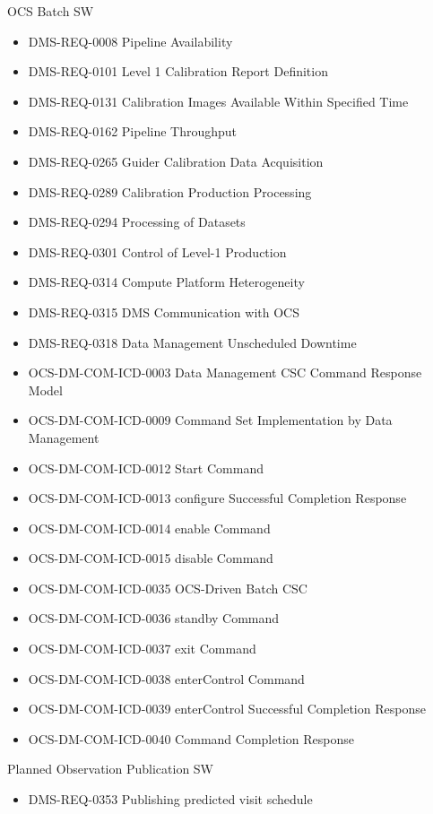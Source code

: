 OCS Batch SW \begin{itemize}
\item DMS-REQ-0008 Pipeline Availability
\item DMS-REQ-0101 Level 1 Calibration Report Definition
\item DMS-REQ-0131 Calibration Images Available Within Specified Time
\item DMS-REQ-0162 Pipeline Throughput
\item DMS-REQ-0265 Guider Calibration Data Acquisition
\item DMS-REQ-0289 Calibration Production Processing
\item DMS-REQ-0294 Processing of Datasets
\item DMS-REQ-0301 Control of Level-1 Production
\item DMS-REQ-0314 Compute Platform Heterogeneity
\item DMS-REQ-0315 DMS Communication with OCS
\item DMS-REQ-0318 Data Management Unscheduled Downtime
\item OCS-DM-COM-ICD-0003 Data Management CSC Command Response Model
\item OCS-DM-COM-ICD-0009 Command Set Implementation by Data Management
\item OCS-DM-COM-ICD-0012 Start Command
\item OCS-DM-COM-ICD-0013 configure Successful Completion Response
\item OCS-DM-COM-ICD-0014 enable Command
\item OCS-DM-COM-ICD-0015 disable Command
\item OCS-DM-COM-ICD-0035 OCS-Driven Batch CSC
\item OCS-DM-COM-ICD-0036 standby Command
\item OCS-DM-COM-ICD-0037 exit Command
\item OCS-DM-COM-ICD-0038 enterControl Command
\item OCS-DM-COM-ICD-0039 enterControl Successful Completion Response
\item OCS-DM-COM-ICD-0040 Command Completion Response
\end{itemize}
Planned Observation Publication SW \begin{itemize}
\item DMS-REQ-0353 Publishing predicted visit schedule
\end{itemize}
